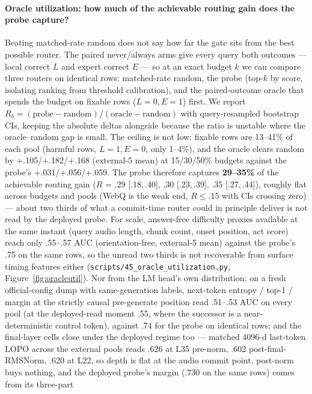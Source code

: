 \paragraph{Oracle utilization: how much of the achievable routing
gain does the probe capture?} Beating matched-rate random does not
say how far the gate sits from the best possible router. The paired
never/always arms give every query both outcomes --- local correct
$L$ and expert correct $E$ --- so at an exact budget $k$ we can
compare three routers on identical rows: matched-rate random, the
probe (top-$k$ by score, isolating ranking from threshold
calibration), and the paired-outcome oracle that spends the budget
on fixable rows ($L{=}0,E{=}1$) first. We report
$R_b=(\text{probe}-\text{random})/(\text{oracle}-\text{random})$
with query-resampled bootstrap CIs, keeping the absolute deltas
alongside because the ratio is unstable where the oracle--random gap
is small. The ceiling is not low: fixable rows are 13--41\% of each
pool (harmful rows, $L{=}1,E{=}0$, only 1--4\%), and the oracle
clears random by $+$.105/$+$.182/$+$.168 (external-5 mean) at
15/30/50\% budgets against the probe's $+$.031/$+$.056/$+$.059. The
probe therefore captures \textbf{29--35\%} of the achievable routing
gain ($R$ = .29 [.18,\,.40], .30 [.23,\,.39], .35 [.27,\,.44]),
roughly flat across budgets and pools (WebQ is the weak end, $R
\le .15$ with CIs crossing zero) --- about two thirds of what a
commit-time router could in principle deliver is not read by the
deployed probe. For scale, answer-free difficulty proxies available
at the same instant (query audio length, chunk count, onset
position, act score) reach only .55--.57 AUC (orientation-free,
external-5 mean) against the probe's .75 on the same rows, so the
unread two thirds is not recoverable from surface timing features
either (\texttt{scripts/45\_oracle\_utilization.py},
Figure~\ref{fig:oracleutil}). Nor from the LM head's own
distribution: on a fresh official-config dump with same-generation
labels, next-token entropy / top-1 / margin at the strictly causal
pre-generate position read .51--.53 AUC on every pool (at the
deployed-read moment .55, where the successor is a near-deterministic
control token), against .74 for the probe on identical rows; and the
final-layer cells close under the deployed regime too --- matched
4096-d last-token LOPO across the external pools reads .626 at L35
pre-norm, .602 post-final-RMSNorm, .620 at L22, so depth is flat at
the audio commit point, post-norm buys nothing, and the deployed
probe's margin (.730 on the same rows) comes from its three-part
